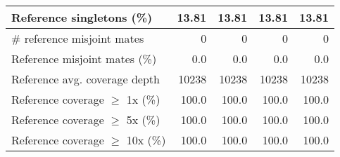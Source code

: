\documentclass[12pt,a4paper]{article}
\begin{document}
\begin{table}[ht]
\begin{center}
\begin{tabular}{|l*{4}{|r}|}
Reference singletons (\%) & 13.81 & 13.81 & 13.81 & 13.81 \\ \hline
\# reference misjoint mates & 0 & 0 & 0 & 0 \\ \hline
Reference misjoint mates (\%) & 0.0 & 0.0 & 0.0 & 0.0 \\ \hline
Reference avg. coverage depth & 10238 & 10238 & 10238 & 10238 \\ \hline
Reference coverage $\geq$ 1x (\%) & 100.0 & 100.0 & 100.0 & 100.0 \\ \hline
Reference coverage $\geq$ 5x (\%) & 100.0 & 100.0 & 100.0 & 100.0 \\ \hline
Reference coverage $\geq$ 10x (\%) & 100.0 & 100.0 & 100.0 & 100.0 \\ \hline
\end{tabular}
\end{center}
\end{table}
\end{document}

